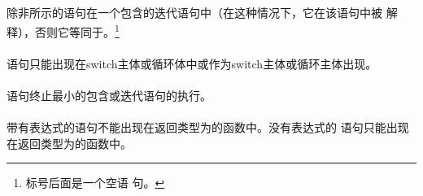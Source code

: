 {\begin{minipage}{0.30\linewidth}
  \mbox{\hspace{2em}}                                           \\
\mbox{\hspace{0em}}                                               \\
\mbox{\hspace{0em}}
\end{minipage}
\hfill
\begin{minipage}{0.30\linewidth}
\mbox{\hspace{0em}}                                    \\
  \mbox{\hspace{2em}}                                           \\
  \mbox{\hspace{2em}}                                           \\
  \mbox{\hspace{2em}}                                           \\
\mbox{\hspace{0em}}                                               \\
\mbox{\hspace{0em}\tm{\}}}
\end{minipage}                                                              \\\\
除非所示的语句在一个包含的迭代语句中（在这种情况下，它在该语句中被
解释），否则它等同于。\footnote{标号后面是一个空语
句。}

\constraint
\paragraph{}
语句只能出现在switch主体或循环体中或作为switch主体或循环主体出现。

\semantic
\paragraph{}
语句终止最小的包含或迭代语句的执行。

\constraint
\paragraph{}
带有表达式的语句不能出现在返回类型为的函数中。没有表达式的
语句只能出现在返回类型为的函数中。

}
